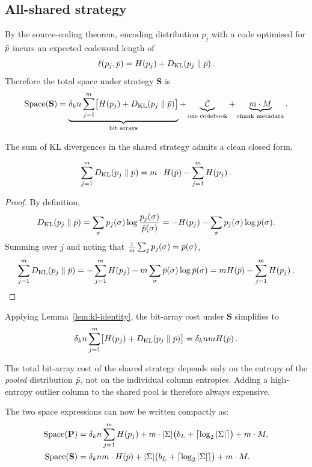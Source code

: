 \subsection{All-shared strategy}

By the source-coding theorem, encoding distribution $p_j$ with a code optimised for
$\bar{p}$ incurs an expected codeword length of
\[
    \ell(p_j, \bar{p}) = H(p_j) + D_{\mathrm{KL}}\!\left(p_j \;\middle\|\; \bar{p}\right).
\]
Therefore the total space under strategy $\mathbf{S}$ is
\[
    \mathrm{Space}(\mathbf{S})
    = \underbrace{\delta_k n \sum_{j=1}^{m}\bigl[H(p_j) + D_{\mathrm{KL}}\!\left(p_j \;\middle\|\; \bar{p}\right)\bigr]}_{\text{bit arrays}}
    + \underbrace{\mathcal{C}}_{\text{one codebook}}
    + \underbrace{m \cdot M}_{\text{chunk metadata}}.
\]

The sum of KL divergences in the shared strategy admits a clean closed form.

\begin{lemma}\label{lem:kl-identity}
    \[
        \sum_{j=1}^{m} D_{\mathrm{KL}}\!\left(p_j \;\middle\|\; \bar{p}\right) = m \cdot H\!\left(\bar{p}\right) - \sum_{j=1}^{m} H\!\left(p_j\right).
    \]
\end{lemma}

\begin{proof}
By definition,
\[
    D_{\mathrm{KL}}\!\left(p_j \;\middle\|\; \bar{p}\right)
    = \sum_{\sigma} p_j(\sigma)\log\frac{p_j(\sigma)}{\bar{p}(\sigma)}
    = -H\!\left(p_j\right) - \sum_{\sigma} p_j(\sigma)\log\bar{p}(\sigma).
\]
Summing over $j$ and noting that $\frac{1}{m}\sum_j p_j(\sigma) = \bar{p}(\sigma)$,
\[
    \sum_{j=1}^{m} D_{\mathrm{KL}}\!\left(p_j \;\middle\|\; \bar{p}\right)
    = -\sum_{j=1}^{m}H\!\left(p_j\right)
      - m\sum_{\sigma}\bar{p}(\sigma)\log\bar{p}(\sigma)
    = mH\!\left(\bar{p}\right) - \sum_{j=1}^{m}H\!\left(p_j\right). \qedhere
\]
\end{proof}

Applying Lemma~\ref{lem:kl-identity}, the bit-array cost under $\mathbf{S}$ simplifies
to
\[
    \delta_k n \sum_{j=1}^{m}\bigl[H(p_j) + D_{\mathrm{KL}}\!\left(p_j \;\middle\|\; \bar{p}\right)\bigr]
    = \delta_k n m H\!\left(\bar{p}\right).
\]

\begin{remark}
    The total bit-array cost of the shared strategy depends only on the entropy of the
    \emph{pooled} distribution $\bar{p}$, not on the individual column entropies. Adding a
    high-entropy outlier column to the shared pool is therefore always expensive.
\end{remark}

The two space expressions can now be written compactly as:
\begin{align}
    \mathrm{Space}(\mathbf{P}) &= \delta_k n \sum_{j=1}^{m} H\!\left(p_j\right)
        + m \cdot |\Sigma|\bigl(b_L + \lceil\log_2|\Sigma|\rceil\bigr)
        + m \cdot M, \label{eq:space-P} \\
    \mathrm{Space}(\mathbf{S}) &= \delta_k n m \cdot H\!\left(\bar{p}\right)
        + |\Sigma|\bigl(b_L + \lceil\log_2|\Sigma|\rceil\bigr)
        + m \cdot M. \label{eq:space-S}
\end{align}

